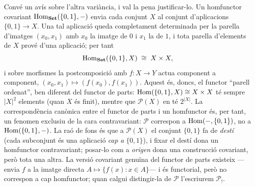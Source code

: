 \begin{exemple}
Convé un avís sobre l'altra variància, i val la pena justificar-lo. Un homfunctor covariant $\operatorname{Hom}_{\mathbf{Set}}(\{0,1\},-)$ envia cada conjunt $X$ al conjunt d'aplicacions $\{0,1\}\to X$. Una tal aplicació queda completament determinada per la parella d'imatges $(x_0,x_1)$ amb $x_0$ la imatge de $0$ i $x_1$ la de $1$, i tota parella d'elements de $X$ prové d'una aplicació; per tant
\[
\operatorname{Hom}_{\mathbf{Set}}(\{0,1\},X)\;\cong\;X\times X,
\]
i sobre morfismes la postcomposició amb $f\colon X\to Y$ actua component a component, $(x_0,x_1)\mapsto(f(x_0),f(x_1))$. Aquest és, doncs, el functor \enquote{parell ordenat}, ben diferent del functor de parts: $\operatorname{Hom}(\{0,1\},X)\cong X\times X$ té sempre $\lvert X\rvert^2$ elements (quan $X$ és finit), mentre que $\mathcal P(X)$ en té $2^{\lvert X\rvert}$. La correspondència canònica entre el functor de parts i un homfunctor és, per tant, un fenomen exclusiu de la cara contravariant: $\mathcal P$ correspon a $\operatorname{Hom}(-,\{0,1\})$, no a $\operatorname{Hom}(\{0,1\},-)$. La raó de fons és que a $\mathcal P(X)$ el conjunt $\{0,1\}$ fa de \emph{destí} (cada subconjunt és una aplicació \emph{cap a} $\{0,1\}$), i fixar el destí dona un homfunctor contravariant; posar-lo com a \emph{origen} dona una construcció covariant, però tota una altra. La versió covariant genuïna del functor de parts existeix ---envia $f$ a la imatge directa $A\mapsto\{f(x):x\in A\}$--- i és functorial, però no correspon a cap homfunctor; quan calgui distingir-la de $\mathcal P$ l'escriurem $\mathcal P_!$.
\end{exemple}

